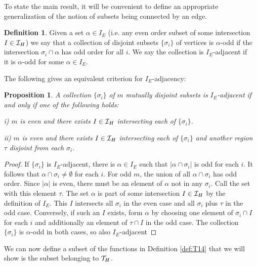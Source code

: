 \documentclass[12pt]{article}
\newtheorem{proposition}[theorem]{Proposition}
\theoremstyle{definition}
\newtheorem{definition}[theorem]{Definition}
\begin{document}
To state the main result, it will be convenient to define an appropriate generalization of the notion of subsets being connected by an edge. 
\begin{definition}
Given a set $\alpha \in I_E$ (i.e. any even order subset of some intersection $I \in {\cal I}_H$) we say that a collection of disjoint subsets $\{\sigma_i\}$ of vertices is $\alpha$-odd if the intersection $\sigma_i \cap \alpha$ has odd order for all $i$. We say the collection is $I_E$-adjacent if it is $\alpha$-odd for some $\alpha \in I_E$.
\end{definition}
The following gives an equivalent criterion for $I_E$-adjacency:
\begin{proposition}
\label{prop:adjacent}
    A collection $\{\sigma_i\}$ of $m$ mutually disjoint subsets is $I_E$-adjacent if and only if one of the following holds:
    
    i) $m$ is even and there exists $I \in {\cal I}_H$ intersecting each of $\{\sigma_i\}$. 
    
    ii) $m$ is even and there exists $I \in {\cal I}_H$ intersecting each of $\{\sigma_i\}$ and another region $\tau$ disjoint from each $\sigma_i$. 
\end{proposition}
\begin{proof}
    If $\{\sigma_i\}$ is $I_E$-adjacent, there is $\alpha \in I_E$ such that $|\alpha \cap \sigma_i|$ is odd for each $i$. It follows that $\alpha \cap \sigma_i \ne \emptyset$ for each $i$. For odd $m$, the union of all $\alpha \cap \sigma_i$ has odd order. Since $|\alpha|$ is even, there must be an element of $\alpha$ not in any $\sigma_i$. Call the set with this element $\tau$.
    The set $\alpha$ is part of some intersection $I \in {\cal I}_H$ by the definition of $I_E$. This $I$ intersects all $\sigma_i$ in the even case and all $\sigma_i$ plus $\tau$ in the odd case. Conversely, if such an $I$ exists, form $\alpha$ by choosing one element of $\sigma_i \cap I$ for each $i$ and additionally an element of $\tau \cap I$ in the odd case. The collection $\{\sigma_i \}$ is $\alpha$-odd in both cases, so also $I_E$-adjacent
\end{proof}
We can now define a subset of the functions in Definition \ref{def:T14} that we will show is the subset belonging to ${\cal T}_H$.
\end{document}
